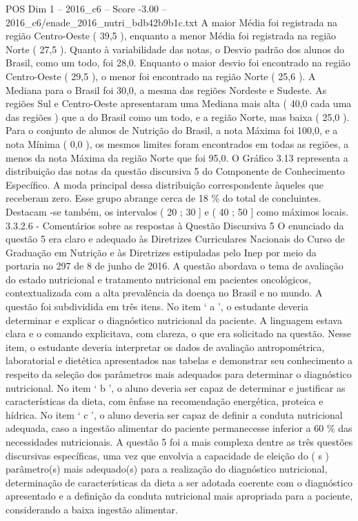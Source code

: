\begin{textsample}{POS Dim 1 – 2016\_c6 – Score -3.00 – 2016\_c6/enade\_2016\_nutri\_bdb42b9b1c.txt}
A maior Média foi registrada na região Centro-Oeste ( 39,5 ), enquanto a menor Média foi registrada na região Norte ( 27,5 ).
Quanto à variabilidade das notas, o Desvio padrão dos alunos do Brasil, como um todo, foi 28,0.
Enquanto o maior desvio foi encontrado na região Centro-Oeste ( 29,5 ), o menor foi encontrado na região Norte ( 25,6 ).
A Mediana para o Brasil foi 30,0, a mesma das regiões Nordeste e Sudeste.
As regiões Sul e Centro-Oeste apresentaram uma Mediana mais alta ( 40,0 cada uma das regiões ) que a do Brasil como um todo, e a região Norte, mas baixa ( 25,0 ).
Para o conjunto de alunos de Nutrição do Brasil, a nota Máxima foi 100,0, e a nota Mínima ( 0,0 ), os mesmos limites foram encontrados em todas as regiões, a menos da nota Máxima da região Norte que foi 95,0.
O Gráfico 3.13 representa a distribuição das notas da questão discursiva 5 do Componente de Conhecimento Específico.
A moda principal dessa distribuição correspondente àqueles que receberam zero.
Esse grupo abrange cerca de 18 \% do total de concluintes.
Destacam -se também, os intervalos ( 20 ; 30 ] e ( 40 ; 50 ] como máximos locais. 3.3.2.6 - Comentários sobre as respostas à Questão Discursiva 5 O enunciado da questão 5 era claro e adequado às Diretrizes Curriculares Nacionais do Curso de Graduação em Nutrição e às Diretrizes estipuladas pelo Inep por meio da portaria no 297 de 8 de junho de 2016.
A questão abordava o tema de avaliação do estado nutricional e tratamento nutricional em pacientes oncológicos, contextualizada com a alta prevalência da doença no Brasil e no mundo.
A questão foi subdividida em três itens.
No item ‘ a ’, o estudante deveria determinar e explicar o diagnóstico nutricional da paciente.
A linguagem estava clara e o comando explicitava, com clareza, o que era solicitado na questão.
Nesse item, o estudante deveria interpretar os dados de avaliação antropométrica, laboratorial e dietética apresentados nas tabelas e demonstrar seu conhecimento a respeito da seleção dos parâmetros mais adequados para determinar o diagnóstico nutricional.
No item ‘ b ’, o aluno deveria ser capaz de determinar e justificar as características da dieta, com ênfase na recomendação energética, proteica e hídrica.
No item ‘ c ’, o aluno deveria ser capaz de definir a conduta nutricional adequada, caso a ingestão alimentar do paciente permanecesse inferior a 60 \% das necessidades nutricionais.
A questão 5 foi a mais complexa dentre as três questões discursivas específicas, uma vez que envolvia a capacidade de eleição do ( s ) parâmetro(s) mais adequado(s) para a realização do diagnóstico nutricional, determinação de características da dieta a ser adotada coerente com o diagnóstico apresentado e a definição da conduta nutricional mais apropriada para a paciente, considerando a baixa ingestão alimentar.

\end{textsample}
